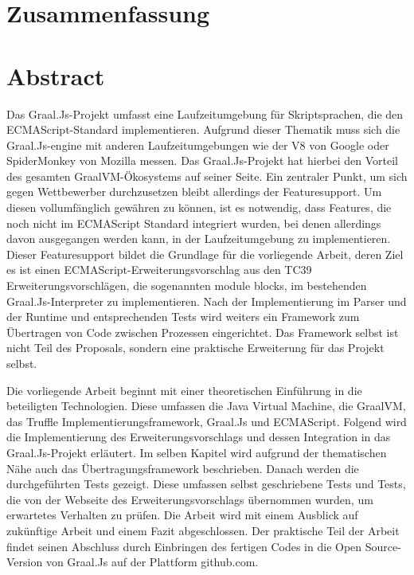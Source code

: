 	{\let\clearpage\relax
	\ifeng	{} \chapter*{Zusammenfassung}
	\else	{} \chapter*{Abstract}
	\fi
		

Das Graal.Js-Projekt umfasst eine Laufzeitumgebung für Skriptsprachen, die den ECMAScript-Standard implementieren. Aufgrund dieser Thematik muss sich die Graal.Js-engine mit anderen Laufzeitumgebungen wie der V8 von Google oder SpiderMonkey von Mozilla messen. Das Graal.Js-Projekt hat hierbei den Vorteil des gesamten GraalVM-Ökosystems auf seiner Seite. Ein zentraler Punkt, um sich gegen Wettbewerber durchzusetzen bleibt allerdings der Featuresupport. Um diesen vollumfänglich gewähren zu können, ist es notwendig, dass Features, die noch nicht im ECMAScript Standard integriert wurden, bei denen allerdings davon ausgegangen werden kann, in der Laufzeitumgebung zu implementieren. Dieser Featuresupport bildet die Grundlage für die vorliegende Arbeit, deren Ziel es ist einen ECMAScript-Erweiterungsvorschlag aus den TC39 Erweiterungsvorschlägen, die sogenannten module blocks, im bestehenden Graal.Js-Interpreter zu implementieren. Nach der Implementierung im Parser und der Runtime und entsprechenden Tests wird weiters ein Framework zum Übertragen von Code zwischen Prozessen eingerichtet. Das Framework selbst ist nicht Teil des Proposals, sondern eine praktische Erweiterung für das Projekt selbst.

Die vorliegende Arbeit beginnt mit einer theoretischen Einführung in die beteiligten Technologien. Diese umfassen die Java Virtual Machine, die GraalVM, das Truffle Implementierungsframework, Graal.Js und ECMAScript. Folgend wird die Implementierung des Erweiterungsvorschlags und dessen Integration in das Graal.Js-Projekt erläutert. Im selben Kapitel wird aufgrund der thematischen Nähe auch das Übertragungsframework beschrieben. Danach werden die durchgeführten Tests gezeigt. Diese umfassen selbst geschriebene Tests und Tests, die von der Webseite des Erweiterungsvorschlags übernommen wurden, um erwartetes Verhalten zu prüfen. Die Arbeit wird mit einem Ausblick auf zukünftige Arbeit und einem Fazit abgeschlossen. Der praktische Teil der Arbeit findet seinen Abschluss durch Einbringen des fertigen Codes in die Open Source-Version von Graal.Js auf der Plattform github.com.

}
